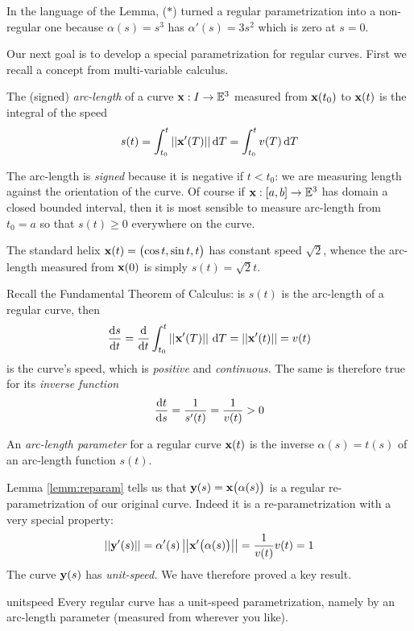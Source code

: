 In the language of the Lemma, ($\ast$) turned a regular parametrization into a non-regular one because $\alpha(s)=s^3$ has $\alpha'(s)=3s^2$ which is zero at $s=0$.\bigbreak

Our next goal is to develop a special parametrization for regular curves. First we recall a concept from multi-variable calculus.

\begin{defn}{}{}
The (signed) \emph{arc-length} of a curve $\vx:I\to\E^3$ measured from $\vx(t_0)$ to $\vx(t)$ is the integral of the speed
\[s(t)=\int_{t_0}^t\Nm{\vx'(T)}\D T =\int_{t_0}^tv(T)\,\D T\]
\end{defn}

The arc-length is \emph{signed} because it is negative if $t<t_0$: we are measuring length against the orientation of the curve. Of course if $\vx:[a,b]\to\E^3$ has domain a closed bounded interval, then it is most sensible to measure arc-length from $t_0=a$ so that $s(t)\ge 0$ everywhere on the curve.

\begin{example}{}{}
The standard helix $\vx(t)=\bigl(\cos t,\sin t,t\bigr)$ has constant speed $\sqrt 2$, whence the arc-length measured from $\vx(0)$ is simply $s(t)=\sqrt 2t$.
\end{example}

Recall the Fundamental Theorem of Calculus: is $s(t)$ is the arc-length of a regular curve, then
\[\diff[s]{t}=\diff t\int_{t_0}^t\Nm{\vx'(T)}\,\D T=\Nm{\vx'(t)}=v(t)\]
is the curve's speed, which is \emph{positive} and \emph{continuous.} The same is therefore true for its \emph{inverse function}
\[\diff[t]{s}=\frac 1{s'(t)}=\frac 1{v(t)}>0\]

\begin{defn}{}{}
An \emph{arc-length parameter} for a regular curve $\vx(t)$ is the inverse $\alpha(s)=t(s)$ of an arc-length function $s(t)$.
\end{defn}

Lemma \ref{lemm:reparam} tells us that $\vy(s)=\vx\bigl(\alpha(s)\bigr)$ is a regular re-parametrization of our original curve. Indeed it is a re-parametrization with a very special property:
\[\Nm{\vy'(s)}=\alpha'(s)\Nm{\vx'\bigl(\alpha(s)\bigr)}=\frac 1{v(t)}v(t)=1\]
The curve $\vy(s)$ has \emph{unit-speed.} We have therefore proved a key result.

\begin{thm}{}{unitspeed}
Every regular curve has a unit-speed parametrization, namely by an arc-length parameter  (measured from wherever you like).
\end{thm}

